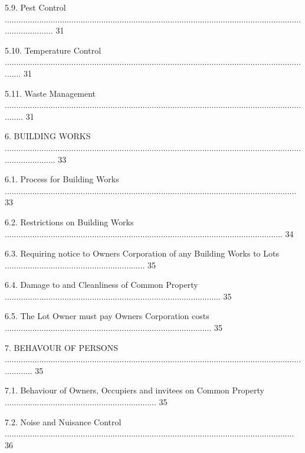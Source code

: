 \documentclass{article}
\begin{document}
{\fontsize{9.99}{1}5.9. Pest Control ...................................................................................................................................................... 31 }

{\fontsize{9.99}{1}5.10. Temperature Control ........................................................................................................................................ 31 }

{\fontsize{9.99}{1}5.11. Waste Management ......................................................................................................................................... 31 }

{\fontsize{9.99}{1}6. BUILDING WORKS ....................................................................................................................................................... 33 }

{\fontsize{9.99}{1}6.1. Process for Building Works ............................................................................................................................... 33 }

{\fontsize{9.99}{1}6.2. Restrictions on Building Works ......................................................................................................................... 34 }

{\fontsize{9.99}{1}6.3. Requiring notice to Owners Corporation of any Building Works to Lots ............................................................. 35 }

{\fontsize{9.99}{1}6.4. Damage to and Cleanliness of Common Property .............................................................................................. 35 }

{\fontsize{9.99}{1}6.5. The Lot Owner must pay Owners Corporation costs .......................................................................................... 35 }

{\fontsize{9.99}{1}7. BEHAVOUR OF PERSONS ............................................................................................................................................. 35 }

{\fontsize{9.99}{1}7.1. Behaviour of Owners, Occupiers and invitees on Common Property .................................................................. 35 }

{\fontsize{9.99}{1}7.2. Noise and Nuisance Control .............................................................................................................................. 36 }
\end{document}
